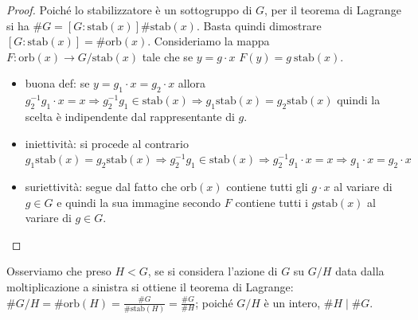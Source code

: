 \begin{proof}
    Poiché lo stabilizzatore è un sottogruppo di $G$, per il teorema di Lagrange si ha $\#G = [G : \text{stab}(x) ]\#\text{stab}(x)$. Basta quindi dimostrare $[G : \text{stab}(x) ] = \# \text{orb}(x)$. Consideriamo la mappa \\ $F : \text{orb}(x) \rightarrow G/\text{stab}(x)$ tale che se $y = g\cdot x$ $F(y) = g \ \text{stab}(x)$.
    \begin{itemize}
        \item buona def: se $y = g_1\cdot x = g_2\cdot x$ allora $g_2^{-1}g_1 \cdot x = x \Rightarrow g_2^{-1}g_1 \in \text{stab}(x) \Rightarrow g_1\text{stab}(x) = g_2\text{stab}(x)$ quindi la scelta è indipendente dal rappresentante di $g$.
        \item iniettività: si procede al contrario $g_1\text{stab}(x) = g_2\text{stab}(x) \Rightarrow g_2^{-1}g_1 \in \text{stab}(x) \Rightarrow g_2^{-1}g_1 \cdot x = x \Rightarrow g_1\cdot x = g_2\cdot x$
        \item suriettività: segue dal fatto che $\text{orb}(x)$ contiene tutti gli $g\cdot x$ al variare di $g \in G$ e quindi la sua immagine secondo $F$ contiene tutti i $g \text{stab}(x)$ al variare di $g \in G$.
    \end{itemize}
\end{proof}

Osserviamo che preso $H < G$, se si considera l'azione di $G$ su $G/H$ data dalla moltiplicazione a sinistra si ottiene il teorema di Lagrange: $\#G/H = \#\text{orb}(H) = \frac{\#G}{\#\text{stab}(H)} = \frac{\#G}{\#H}$; poiché $G/H$ è un intero, $\#H \mid \#G$.

